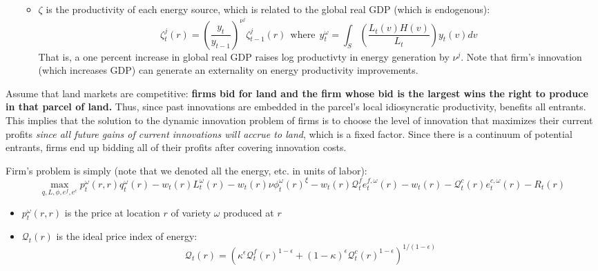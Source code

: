 \documentclass[12pt]{amsart}
\begin{document}
\begin{itemize}
\begin{itemize}
\begin{equation}
        \end{equation}
        \item $\zeta$ is the productivity of each energy source, which is related to the global real GDP (which is endogenous):
        \begin{equation}
            \zeta^j_t(r) = \left(\frac{y_t}{y_{t-1}}\right)^{\nu^j} \zeta^j_{t-1}(r) ~~ \text{where} ~~ y_t^\omega = \int_S \left(\frac{L_t(v) H(v)}{L_t}\right) y_t(v) dv \label{eq:energy_prod}
        \end{equation}
        That is, a one percent increase in global real GDP raises log productivty in energy generation by $\nu^j$. Note that firm's innovation (which increases GDP) can generate an externality on energy productivity improvements. 
    \end{itemize}
\end{itemize}

Assume that land markets are competitive: \textbf{firms bid for land and the firm whose bid is the largest wins the right to produce in that parcel of land.} Thus, since past innovations are embedded in the parcel's local idiosyncratic productivity, benefits all entrants. This implies that the solution to the dynamic innovation problem of firms is to choose the level of innovation that maximizes their current profits \textit{since all future gains of current innovations will accrue to land}, which is a fixed factor. Since there is a continuum of potential entrants, firms end up bidding all of their profits after covering innovation costs.

Firm's problem is simply (note that we denoted all the energy, etc. in units of labor):
\begin{equation*}
    \max_{q,L,\phi, e^f, e^c} p_t^\omega(r, r) q_t^\omega(r) - w_t(r) L_t^\omega(r) - w_t(r) \nu \phi_t^\omega(r)^\xi - w_t(r) \mathcal{Q}_t^fe_t^{f,\omega}(r) - w_t(r) - \mathcal{Q}_t^c(r) e_t^{c, \omega}(r) - R_t(r) 
\end{equation*}
\begin{itemize}
    \item $p_t^\omega(r,r)$ is the price at location $r$ of variety $\omega$ produced at $r$
    \item $\mathcal{Q}_t(r)$ is the ideal price index of energy: 
    \begin{equation*}
        \mathcal{Q}_t(r) = \left(\kappa^\epsilon \mathcal{Q}_t^f(r)^{1-\epsilon} + (1-\kappa)^\epsilon \mathcal{Q}_t^c(r)^{1-\epsilon}\right)^{1/(1-\epsilon)}
    \end{equation*}
\end{itemize}
\end{document}
